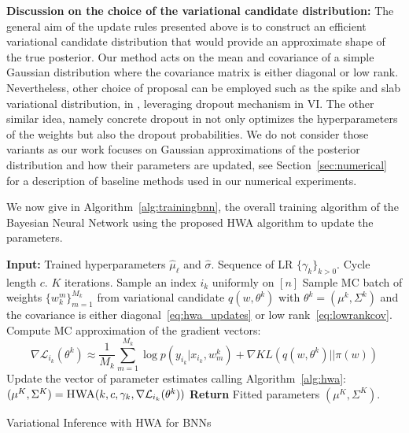 \documentclass{article} %
\begin{document}
\textbf{Discussion on the choice of the variational candidate distribution:} 
The general aim of the update rules presented above is to construct an efficient variational candidate distribution that would provide an approximate shape of the true posterior. Our method acts on the mean and covariance of a simple Gaussian distribution where the covariance matrix is either diagonal or low rank.
Nevertheless, other choice of proposal can be employed such as the spike and slab variational distribution, in \citep{gal2016dropout}, leveraging dropout mechanism in VI. 
The other similar idea, namely concrete dropout in \citep{gal2017concrete} not only optimizes the hyperparameters of the weights but also the dropout probabilities.
We do not consider those variants as our work focuses on Gaussian approximations of the posterior distribution and how their parameters are updated, see Section~\ref{sec:numerical} for a description of baseline methods used in our numerical experiments.


We now give in Algorithm~\ref{alg:trainingbnn}, the overall training algorithm of the Bayesian Neural Network using the proposed HWA algorithm to update the parameters.
\begin{algorithm}[H]
\begin{algorithmic}[1]
\STATE \textbf{Input:} Trained hyperparameters $\hat{\mu}_{\ell}$ and $\hat{\sigma}$. Sequence of LR $\{\gamma_k\}_{k > 0}$. Cycle length $c$. $K$ iterations.
\STATE Sample an index $i_k$ uniformly on $[n]$
\STATE Sample MC batch of weights $\{w^m_k\}_{m=1}^{M_k}$  from variational candidate $q(w, \theta^k)$ with $\theta^k = (\mu^k, \Sigma^k)$ and the covariance is either diagonal~\eqref{eq:hwa_updates} or low rank~\eqref{eq:lowrankcov}.
\STATE Compute MC approximation of the gradient vectors:
$$ \nabla \mathcal{L}_{i_{k}}(\theta^{k}) \approx \frac{1}{M_k} \sum_{m=1}^{M_k} \log p(y_{i_k} | x_{i_k}, w^k_m)  + \nabla KL(q(w, \theta^k)||\pi(w)) $$
\STATE Update the vector of parameter estimates calling Algorithm~\ref{alg:hwa}: $(\mu^K, \Sigma^K) =  \textsc{HWA}(k, c, \gamma_k, \nabla \mathcal{L}_{i_{k}}(\theta^{k}) )$
\ENDFOR
\STATE \textbf{Return} Fitted parameters $(\mu^K, \Sigma^K)$.
\end{algorithmic}
\caption{Variational Inference with HWA for BNNs}
\label{alg:trainingbnn}
\end{algorithm}

\end{document}
